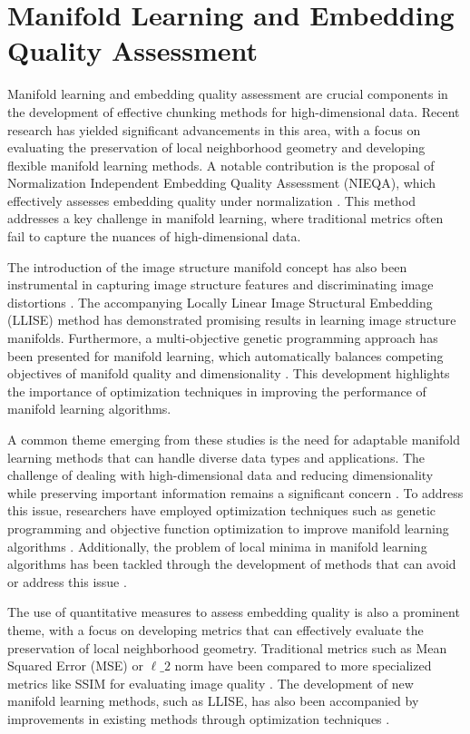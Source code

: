 \documentclass[conference]{IEEEtran}
\begin{document}
\section{Manifold Learning and Embedding Quality Assessment}
Manifold learning and embedding quality assessment are crucial components in the development of effective chunking methods for high-dimensional data. Recent research has yielded significant advancements in this area, with a focus on evaluating the preservation of local neighborhood geometry and developing flexible manifold learning methods. A notable contribution is the proposal of Normalization Independent Embedding Quality Assessment (NIEQA), which effectively assesses embedding quality under normalization \cite{b1}. This method addresses a key challenge in manifold learning, where traditional metrics often fail to capture the nuances of high-dimensional data.

The introduction of the image structure manifold concept has also been instrumental in capturing image structure features and discriminating image distortions \cite{b2}. The accompanying Locally Linear Image Structural Embedding (LLISE) method has demonstrated promising results in learning image structure manifolds. Furthermore, a multi-objective genetic programming approach has been presented for manifold learning, which automatically balances competing objectives of manifold quality and dimensionality \cite{b3}. This development highlights the importance of optimization techniques in improving the performance of manifold learning algorithms.

A common theme emerging from these studies is the need for adaptable manifold learning methods that can handle diverse data types and applications. The challenge of dealing with high-dimensional data and reducing dimensionality while preserving important information remains a significant concern \cite{b2, b3}. To address this issue, researchers have employed optimization techniques such as genetic programming and objective function optimization to improve manifold learning algorithms \cite{b3, b4}. Additionally, the problem of local minima in manifold learning algorithms has been tackled through the development of methods that can avoid or address this issue \cite{b4}.

The use of quantitative measures to assess embedding quality is also a prominent theme, with a focus on developing metrics that can effectively evaluate the preservation of local neighborhood geometry. Traditional metrics such as Mean Squared Error (MSE) or $\ell\_2$ norm have been compared to more specialized metrics like SSIM for evaluating image quality \cite{b2}. The development of new manifold learning methods, such as LLISE, has also been accompanied by improvements in existing methods through optimization techniques \cite{b3}.
\end{document}
